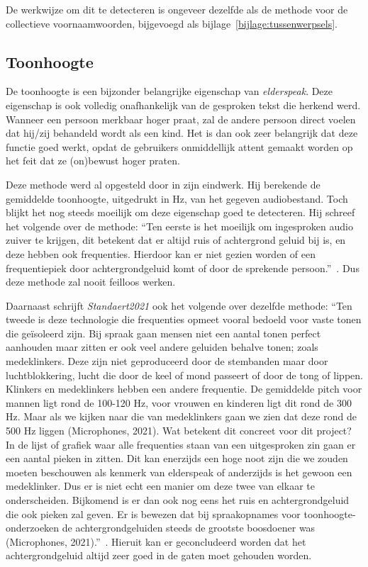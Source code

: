 De werkwijze om dit te detecteren is ongeveer dezelfde als de methode voor de collectieve voornaamwoorden, bijgevoegd als bijlage~\ref{bijlage:tussenwerpsels}.

\subsection{Toonhoogte}
De toonhoogte is een bijzonder belangrijke eigenschap van \textit{elderspeak}. Deze eigenschap is ook volledig onafhankelijk van de gesproken tekst die herkend werd. Wanneer een persoon merkbaar hoger praat, zal de andere persoon direct voelen dat hij/zij behandeld wordt als een kind. Het is dan ook zeer belangrijk dat deze functie goed werkt, opdat de gebruikers onmiddellijk attent gemaakt worden op het feit dat ze (on)bewust hoger praten.

Deze methode werd al opgesteld door \textcite{Standaert2021} in zijn eindwerk. Hij berekende de gemiddelde toonhoogte, uitgedrukt in Hz, van het gegeven audiobestand. Toch blijkt het nog steeds moeilijk om deze eigenschap goed te detecteren. Hij schreef het volgende over de methode:
``Ten eerste is het moeilijk om ingesproken audio zuiver te krijgen, dit betekent dat er altijd
ruis of achtergrond geluid bij is, en deze hebben ook frequenties. Hierdoor kan er niet
gezien worden of een frequentiepiek door achtergrondgeluid komt of door de sprekende
persoon.''~\autocite{Standaert2021}. Dus deze methode zal nooit feilloos werken.

Daarnaast schrijft \textit{Standaert2021} ook het volgende over dezelfde methode:
``Ten tweede is deze technologie die frequenties opmeet vooral bedoeld voor vaste tonen
die geïsoleerd zijn. Bij spraak gaan mensen niet een aantal tonen perfect aanhouden maar
zitten er ook veel andere geluiden behalve tonen; zoals medeklinkers. Deze zijn niet
geproduceerd door de stembanden maar door luchtblokkering, lucht die door de keel of
mond passeert of door de tong of lippen. Klinkers en medeklinkers hebben een andere
frequentie. De gemiddelde pitch voor mannen ligt rond de 100-120 Hz, voor vrouwen en
kinderen ligt dit rond de 300 Hz. Maar als we kijken naar die van medeklinkers gaan we
zien dat deze rond de 500 Hz liggen (Microphones, 2021). Wat betekent dit concreet voor
dit project? In de lijst of grafiek waar alle frequenties staan van een uitgesproken zin gaan
er een aantal pieken in zitten. Dit kan enerzijds een hoge noot zijn die we zouden moeten
beschouwen als kenmerk van elderspeak of anderzijds is het gewoon een medeklinker. Dus
er is niet echt een manier om deze twee van elkaar te onderscheiden. Bijkomend is er dan
ook nog eens het ruis en achtergrondgeluid die ook pieken zal geven. Er is bewezen dat bij
spraakopnames voor toonhoogte-onderzoeken de achtergrondgeluiden steeds de grootste
boosdoener was (Microphones, 2021).''~\autocite{Standaert2021}. Hieruit kan er geconcludeerd worden dat het achtergrondgeluid altijd zeer goed in de gaten moet gehouden worden.

